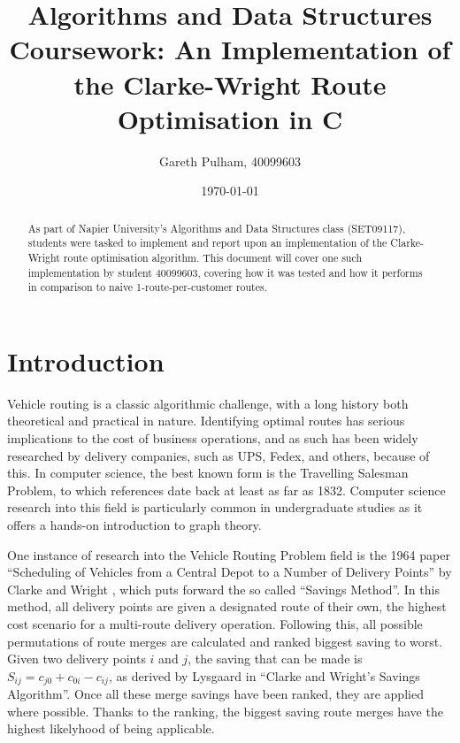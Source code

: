 \documentclass[a4paper]{article}
\begin{document}
    \begin{titlepage}
        \title{Algorithms and Data Structures Coursework: An Implementation of the Clarke-Wright Route Optimisation in C}
        \author{Gareth Pulham, 40099603}
        \date{\today}
        \maketitle
        \thispagestyle{empty}
        \begin{abstract}
            As part of Napier University's Algorithms and Data Structures class (SET09117), students were tasked to implement and report upon an implementation
            of the Clarke-Wright \cite{CW} route optimisation algorithm. This document will cover one such implementation by student 40099603, covering how it was
            tested and how it performs in comparison to naive 1-route-per-customer routes.
        \end{abstract}
    \end{titlepage}

    \tableofcontents

    \section{Introduction}
    Vehicle routing is a classic algorithmic challenge, with a long history both theoretical and practical in nature.
    Identifying optimal routes has serious implications to the cost of business operations, and as such has been widely researched by delivery companies,
    such as UPS, Fedex, and others, because of this.
    In computer science, the best known form is the Travelling Salesman Problem, to which references date back at least as far as 1832. Computer science
    research into this field is particularly common in undergraduate studies as it offers a hands-on introduction to graph theory.

    One instance of research into the Vehicle Routing Problem field is the 1964 paper ``Scheduling of Vehicles from a Central Depot to a Number of Delivery Points''
    by Clarke and Wright \cite{CW}, which puts forward the so called ``Savings Method''. In this method, all delivery points are given a designated route of their
    own, the highest cost scenario for a multi-route delivery operation. Following this, all possible permutations of route merges are calculated and ranked
    biggest saving to worst. Given two delivery points $i$ and $j$, the saving that can be made is $ S_{ij} = c_{j0} + c_{0i} - c_{ij} $, as derived by
    Lysgaard \cite{Lysgaard} in ``Clarke and Wright's Savings Algorithm''. Once all these merge savings have been ranked, they are applied where possible. 
    Thanks to the ranking, the biggest saving route merges have the highest likelyhood of being applicable.
\end{document}
